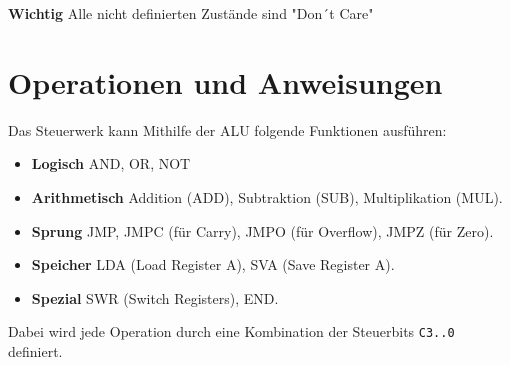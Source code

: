 \noindent \textbf{Wichtig} Alle nicht definierten Zustände sind "Don´t Care"


\section{Operationen und Anweisungen}
Das Steuerwerk kann Mithilfe der ALU folgende Funktionen ausführen:
\begin{itemize}
    \item \textbf{Logisch} AND, OR, NOT
    \item \textbf{Arithmetisch} Addition (ADD), Subtraktion (SUB), Multiplikation (MUL).
    \item \textbf{Sprung} JMP, JMPC (für Carry), JMPO (für Overflow), JMPZ (für Zero).
    \item \textbf{Speicher} LDA (Load Register A), SVA (Save Register A).
    \item \textbf{Spezial} SWR (Switch Registers), END.
\end{itemize}

\noindent Dabei wird jede Operation durch eine Kombination der Steuerbits \texttt{C3..0} definiert.

